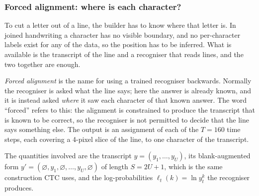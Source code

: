 \subsubsection{Forced alignment: where is each character?}

To cut a letter out of a line, the builder has to know where that letter is. In joined handwriting a character has no visible boundary, and no per-character labels exist for any of the data, so the position has to be inferred. What is available is the transcript of the line and a recogniser that reads lines, and the two together are enough.

\emph{Forced alignment} is the name for using a trained recogniser backwards. Normally the recogniser is asked what the line says; here the answer is already known, and it is instead asked \emph{where} it saw each character of that known answer. The word ``forced'' refers to this: the alignment is constrained to produce the transcript that is known to be correct, so the recogniser is not permitted to decide that the line says something else. The output is an assignment of each of the $T=160$ time steps, each covering a 4-pixel slice of the line, to one character of the transcript.

The quantities involved are the transcript $y=(y_1,\ldots,y_U)$, its blank-augmented form $y'=(\varnothing,y_1,\varnothing,\ldots,y_U,\varnothing)$ of length $S=2U+1$, which is the same construction CTC uses, and the log-probabilities $\ell_t(k)=\ln y_t^k$ the recogniser produces.

